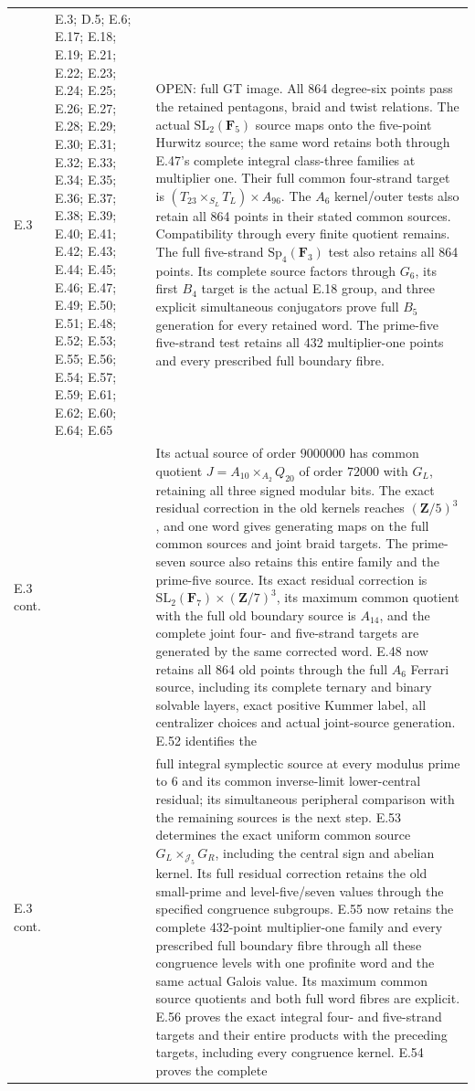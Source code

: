 \begin{longtable}{@{}p{1.1cm}p{3.0cm}p{10.3cm}@{}}
E.3 & E.3; D.5; E.6; E.17; E.18; E.19; E.21; E.22; E.23; E.24; E.25; E.26; E.27; E.28; E.29; E.30; E.31; E.32; E.33; E.34; E.35; E.36; E.37; E.38; E.39; E.40; E.41; E.42; E.43; E.44; E.45; E.46; E.47; E.49; E.50; E.51; E.48; E.52; E.53; E.55; E.56; E.54; E.57; E.59; E.61; E.62; E.60; E.64; E.65 & OPEN: full GT image. All 864 degree-six points pass the retained pentagons, braid and twist relations. The actual $\mathrm{SL}_2(\mathbf F_5)$ source maps onto the five-point Hurwitz source; the same word retains both through E.47's complete integral class-three families at multiplier one. Their full common four-strand target is $(T_{23}\times_{S_L}T_L)\times A_{96}$. The $A_6$ kernel/outer tests also retain all 864 points in their stated common sources. Compatibility through every finite quotient remains. The full five-strand $\mathrm{Sp}_4(\mathbf F_3)$ test also retains all 864 points. Its complete source factors through $G_6$, its first $B_4$ target is the actual E.18 group, and three explicit simultaneous conjugators prove full $B_5$ generation for every retained word. The prime-five five-strand test retains all 432 multiplier-one points and every prescribed full boundary fibre.  \\
E.3 cont. &  & Its actual source of order $9000000$ has common quotient $J=A_{10}\times_{A_2}Q_{20}$ of order $72000$ with $G_L$, retaining all three signed modular bits. The exact residual correction in the old kernels reaches $(\mathbf Z/5)^3$, and one word gives generating maps on the full common sources and joint braid targets. The prime-seven source also retains this entire family and the prime-five source. Its exact residual correction is $\mathrm{SL}_2(\mathbf F_7)\times(\mathbf Z/7)^3$, its maximum common quotient with the full old boundary source is $A_{14}$, and the complete joint four- and five-strand targets are generated by the same corrected word. E.48 now retains all 864 old points through the full $A_6$ Ferrari source, including its complete ternary and binary solvable layers, exact positive Kummer label, all centralizer choices and actual joint-source generation. E.52 identifies the  \\
E.3 cont. &  & full integral symplectic source at every modulus prime to 6 and its common inverse-limit lower-central residual; its simultaneous peripheral comparison with the remaining sources is the next step. E.53 determines the exact uniform common source $G_L\times_{\mathcal J_5}G_R$, including the central sign and abelian kernel. Its full residual correction retains the old small-prime and level-five/seven values through the specified congruence subgroups. E.55 now retains the complete 432-point multiplier-one family and every prescribed full boundary fibre through all these congruence levels with one profinite word and the same actual Galois value. Its maximum common source quotients and both full word fibres are explicit. E.56 proves the exact integral four- and five-strand targets and their entire products with the preceding targets, including every congruence kernel. E.54 proves the complete  \\

\end{longtable}

